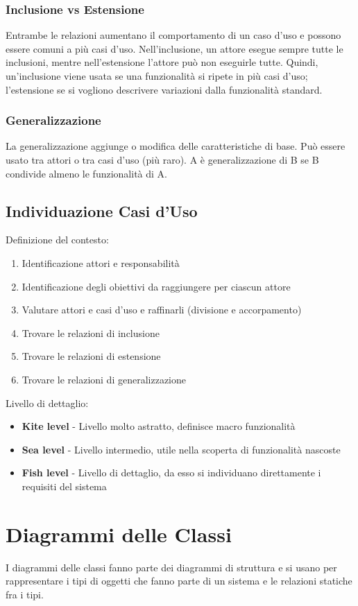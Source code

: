 \subsubsection{Inclusione vs Estensione}
Entrambe le relazioni aumentano il comportamento di un caso d'uso e possono essere comuni a più casi d'uso. 
Nell'inclusione, un attore esegue sempre tutte le inclusioni, mentre nell'estensione l'attore può non eseguirle tutte.
Quindi, un'inclusione viene usata se una funzionalità si ripete in più casi d'uso; 
l'estensione se si vogliono descrivere variazioni dalla funzionalità standard. 

\subsubsection{Generalizzazione}
La generalizzazione aggiunge o modifica delle caratteristiche di base. 
Può essere usato tra attori o tra casi d'uso (più raro). 
A è generalizzazione di B se B condivide almeno le funzionalità di A.

\subsection{Individuazione Casi d'Uso}

Definizione del contesto:
\begin{enumerate}
\item Identificazione attori e responsabilità
\item Identificazione degli obiettivi da raggiungere per ciascun attore
\item Valutare attori e casi d'uso e raffinarli (divisione e accorpamento)
\item Trovare le relazioni di inclusione
\item Trovare le relazioni di estensione
\item Trovare le relazioni di generalizzazione
\end{enumerate}
Livello di dettaglio:
\begin{itemize}
\item \textbf{Kite level} - Livello molto astratto, definisce macro funzionalità
\item \textbf{Sea level} - Livello intermedio, utile nella scoperta di funzionalità nascoste
\item \textbf{Fish level} - Livello di dettaglio, da esso si individuano direttamente i requisiti del sistema
\end{itemize}

\section{Diagrammi delle Classi}
I diagrammi delle classi fanno parte dei diagrammi di struttura e si usano per rappresentare i tipi di oggetti che fanno parte di un sistema e le relazioni statiche fra i tipi. 

